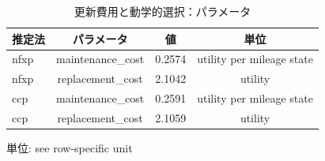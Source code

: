 \begingroup
\begin{table}[htbp]
\centering
\caption{更新費用と動学的選択：パラメータ}
\label{tab:specialist-ddc-r01-displays-parameters}
\begin{tabular}{lccc}
\toprule
推定法 & パラメータ & 値 & 単位 \\
\midrule
nfxp & maintenance\_cost & 0.2574 & utility per mileage state \\
nfxp & replacement\_cost & 2.1042 & utility \\
ccp & maintenance\_cost & 0.2591 & utility per mileage state \\
ccp & replacement\_cost & 2.1059 & utility \\
\bottomrule
\end{tabular}
\par\medskip\begin{minipage}{\linewidth}\footnotesize
単位: see row-specific unit
\end{minipage}
\end{table}
\endgroup
